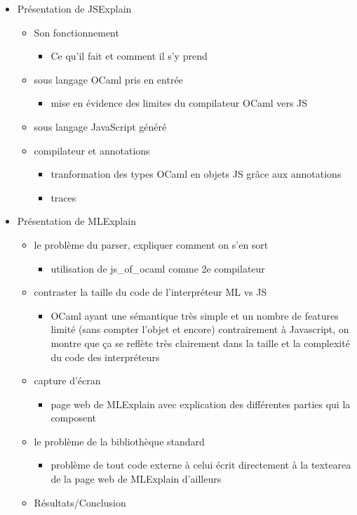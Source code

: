 \documentclass{easychair}
\begin{document}
\begin{itemize}
\item Présentation de JSExplain
  \begin{itemize}
  \item Son fonctionnement
    \begin{itemize}
    \item Ce qu'il fait et comment il s'y prend
    \end{itemize}
  \item sous langage OCaml pris en entrée
    \begin{itemize}
    \item mise en évidence des limites du compilateur OCaml vers JS
    \end{itemize}
  \item sous langage JavaScript généré
  \item compilateur et annotations
    \begin{itemize}
    \item tranformation des types OCaml en objets JS grâce aux annotations
    \item traces
    \end{itemize}
  \end{itemize}
\item Présentation de MLExplain
  \begin{itemize}
  \item le problème du parser, expliquer comment on s'en sort
    \begin{itemize}
    \item utilisation de js\_of\_ocaml comme 2e compilateur
    \end{itemize}
  \item contraster la taille du code de l'interpréteur ML vs JS
    \begin{itemize}
    \item OCaml ayant une sémantique très simple et un nombre de features limité (sans compter l'objet et encore) contrairement à Javascript, on montre que ça se reflète très clairement dans la taille et la complexité du code des interpréteurs
    \end{itemize}
  \item capture d'écran
    \begin{itemize}
    \item page web de MLExplain avec explication des différentes parties qui la composent
    \end{itemize}
  \item le problème de la bibliothèque standard
    \begin{itemize}
    \item problème de tout code externe à celui écrit directement à la textearea de la page web de MLExplain d'ailleurs
    \end{itemize}
  \item Résultats/Conclusion
  \end{itemize}
\end{itemize}
\end{document}
